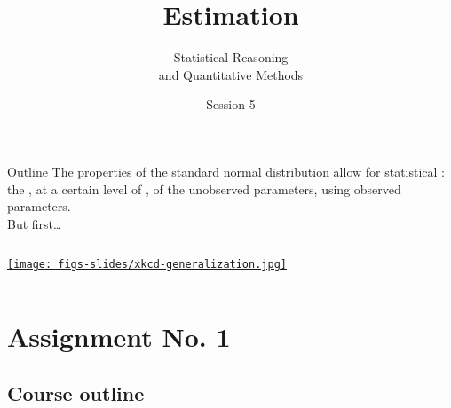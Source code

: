 \documentclass{beamer}
\author{Statistical Reasoning\\and Quantitative Methods}
\title{Estimation}
\institute{François Briatte \& Ivaylo Petev}
\date{Session 5}
\begin{document}
	\begin{frame}[t,plain]
		\titlepage
	\end{frame}

	\begin{frame}[t]{Outline}
		The properties of the standard normal distribution allow for statistical : the , at a certain level of , of the unobserved  parameters, using observed  parameters.\\[1em]
		
		But first…
		
		\begin{columns}[T]
			\tableofcontents[hideallsubsections]
			\begin{center}
			\href{http://xkcd.com/385/}{\texttt{[image: figs-slides/xkcd-generalization.jpg]}}		
			\end{center}
		\end{columns}
	\end{frame}


	
	\section{Assignment No. 1}
	
	
	\subsection{Course outline}
	
\end{document}
